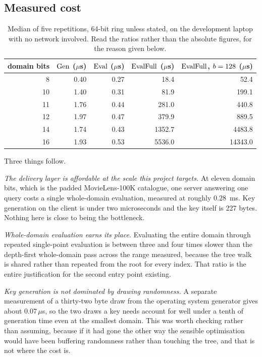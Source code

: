 \subsection{Measured cost}
\label{sec:tech:bench:results}

\begin{table}[h]
\centering
\small
\caption{Median of five repetitions, 64-bit ring unless stated, on the
development laptop with no network involved. Read the ratios rather than the
absolute figures, for the reason given below.}
\label{tab:tech:bench}
\begin{tabular}{@{}rrrrr@{}}
\toprule
domain bits & $\operatorname{Gen}$ ($\mu$s) & $\operatorname{Eval}$ ($\mu$s) &
$\operatorname{EvalFull}$ ($\mu$s) & $\operatorname{EvalFull}$, $b=128$ ($\mu$s) \\
\midrule
8  & 0.40 & 0.27 & 18.4   & 52.4    \\
10 & 1.40 & 0.31 & 81.9   & 199.1   \\
11 & 1.76 & 0.44 & 281.0  & 440.8   \\
12 & 1.97 & 0.47 & 379.9  & 889.5   \\
14 & 1.74 & 0.43 & 1352.7 & 4483.8  \\
16 & 1.93 & 0.53 & 5536.0 & 14343.0 \\
\bottomrule
\end{tabular}
\end{table}

Three things follow.

\emph{The delivery layer is affordable at the scale this project targets.} At
eleven domain bits, which is the padded MovieLens-100K catalogue, one server
answering one query costs a single whole-domain evaluation, measured at roughly
$0.28$~ms. Key generation on the client is under two microseconds and the key
itself is 227 bytes. Nothing here is close to being the bottleneck.

\emph{Whole-domain evaluation earns its place.} Evaluating the entire domain
through repeated single-point evaluation is between three and four times slower
than the depth-first whole-domain pass across the range measured, because the
tree walk is shared rather than repeated from the root for every index. That
ratio is the entire justification for the second entry point existing.

\emph{Key generation is not dominated by drawing randomness.} A separate
measurement of a thirty-two byte draw from the operating system generator gives
about $0.07\,\mu$s, so the two draws a key needs account for well under a
tenth of generation time even at the smallest domain. This was worth checking
rather than assuming, because if it had gone the other way the sensible
optimisation would have been buffering randomness rather than touching the
tree, and that is not where the cost is.

